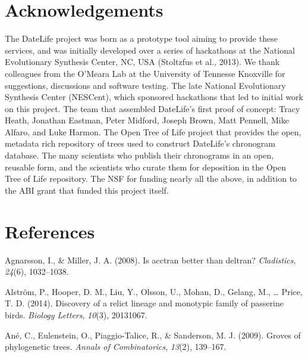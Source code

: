 \documentclass[english,man]{apa6}
\begin{document}
\hypertarget{acknowledgements}{%
\section{Acknowledgements}\label{acknowledgements}}

The DateLife project was born as a prototype tool aiming to provide these services, and was initially developed over a series of hackathons at the National Evolutionary Synthesis Center, NC, USA (Stoltzfus et al., 2013).
We thank colleagues from the O'Meara Lab at the University
of Tennesse Knoxville for suggestions, discussions and software testing.
The late National Evolutionary Synthesis Center (NESCent), which sponsored hackathons
that led to initial work on this project. The team that assembled DateLife's first proof of concept: Tracy Heath, Jonathan Eastman, Peter Midford, Joseph Brown, Matt Pennell, Mike Alfaro, and Luke Harmon.
The Open Tree of Life project that provides the open, metadata rich repository of
trees used to construct DateLife's chronogram database.
The many scientists who publish their chronograms in an open, reusable form, and the scientists who curate them for deposition in the Open Tree of Life repository.
The NSF for funding nearly all the above, in addition to the ABI grant that funded this project itself.

\newpage

\hypertarget{references}{%
\section{References}\label{references}}

\begingroup
\setlength{\parindent}{-0.5in}
\setlength{\leftskip}{0.5in}

\hypertarget{refs}{}
\leavevmode\hypertarget{ref-agnarsson2008acctran}{}%
Agnarsson, I., \& Miller, J. A. (2008). Is acctran better than deltran? \emph{Cladistics}, \emph{24}(6), 1032--1038.

\leavevmode\hypertarget{ref-alstrom2014discovery}{}%
Alström, P., Hooper, D. M., Liu, Y., Olsson, U., Mohan, D., Gelang, M., \ldots{} Price, T. D. (2014). Discovery of a relict lineage and monotypic family of passerine birds. \emph{Biology Letters}, \emph{10}(3), 20131067.

\leavevmode\hypertarget{ref-ane2009groves}{}%
Ané, C., Eulenstein, O., Piaggio-Talice, R., \& Sanderson, M. J. (2009). Groves of phylogenetic trees. \emph{Annals of Combinatorics}, \emph{13}(2), 139--167.
\end{document}

